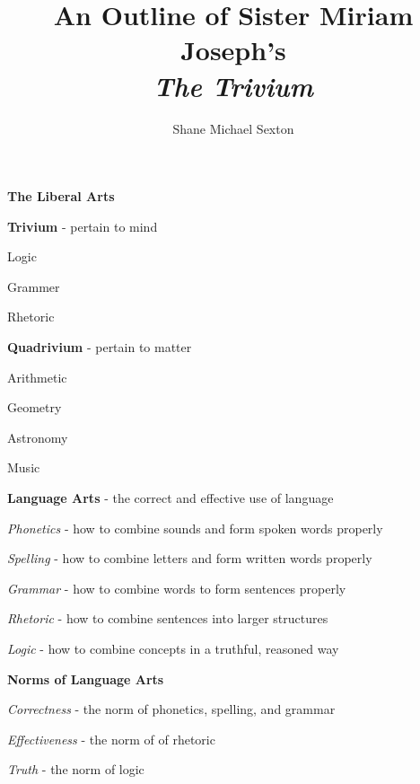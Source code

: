\documentclass{report}
\begin{document}
\title{An Outline of Sister Miriam Joseph's \\ \textit{The Trivium}}
\author{Shane Michael Sexton}

\maketitle
\begin{outline}
  \item {\bf The Liberal Arts}
  \begin{outline}
    \item {\bf Trivium} - pertain to mind
    \begin{outline}
       \item Logic
       \item Grammer
       \item Rhetoric
     \end{outline}
    \item {\bf Quadrivium} - pertain to matter
    \begin{outline}
       \item Arithmetic
       \item Geometry
       \item Astronomy
       \item Music
     \end{outline}
     \item {\bf Language Arts} - the correct and effective use of language
    \begin{outline}
       \item \textit{Phonetics} - how to combine sounds and form spoken words properly
       \item \textit{Spelling} - how to combine letters and form written words properly
       \item \textit{Grammar} - how to combine words to form sentences properly
       \item \textit{Rhetoric} - how to combine sentences into larger structures
       \item \textit{Logic} - how to combine concepts in a truthful, reasoned way
     \end{outline}
    \item {\bf Norms of Language Arts} 
    \begin{outline}
       \item \textit{Correctness} - the norm of phonetics, spelling, and grammar
       \item \textit{Effectiveness} - the norm of of rhetoric
       \item \textit{Truth} - the norm of logic

\end{outline}
\end{outline}
\end{outline}
\end{document}
